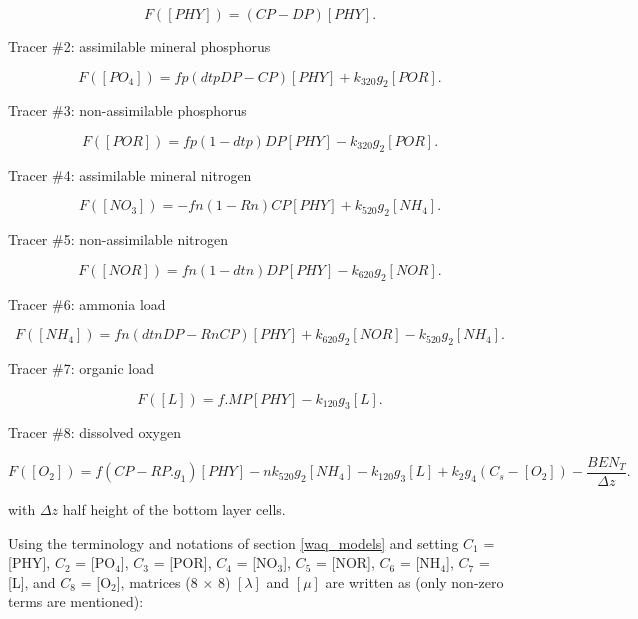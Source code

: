 \begin{equation}
  F([PHY]) = (CP-DP) [PHY].
\end{equation}

Tracer $\#$2: assimilable mineral phosphorus

\begin{equation}
  F([PO_4]) = fp(dtp DP - CP) [PHY] + k_{320} g_2 [POR].
\end{equation}

Tracer $\#$3: non-assimilable phosphorus

\begin{equation}
  F([POR]) = fp(1-dtp) DP [PHY] - k_{320} g_2 [POR].
\end{equation}

Tracer $\#$4: assimilable mineral nitrogen

\begin{equation}
  F([NO_3]) = - fn (1- Rn) CP [PHY] + k_{520} g_2 [NH_4].
\end{equation}

Tracer $\#$5: non-assimilable nitrogen

\begin{equation}
  F([NOR]) = fn (1- dtn) DP [PHY] - k_{620} g_2 [NOR].
\end{equation}

Tracer $\#$6: ammonia load

\begin{equation}
  F([NH_4]) = fn (dtn DP - Rn CP) [PHY] + k_{620} g_2 [NOR] - k_{520} g_2 [NH_4].
\end{equation}

Tracer $\#$7: organic load

\begin{equation}
  F([L]) = f.MP [PHY] - k_{120} g_3 [L].
\end{equation}

Tracer $\#$8: dissolved oxygen

\begin{equation}
  F([O_2]) = f (CP - RP.g_1) [PHY] - n k_{520} g_2 [NH_4] - k_{120} g_3 [L] + k_2 g_4 (C_s - [O_2]) - \frac{BEN_T}{\Delta z}.
\end{equation}

with $\Delta z$ half height of the bottom layer cells.

Using the terminology and notations of section \ref{waq_models} and setting
$C_1$ = [PHY], $C_2$  = [PO$_4$], $C_3$ = [POR], $C_4$ = [NO$_3$], $C_5$ = [NOR],
$C_6$ = [NH$_4$], $C_7$ = [L], and $C_8$ = [O$_2$],
matrices (8 $\times$ 8) $[\lambda]$ and $[\mu]$
are written as (only non-zero terms are mentioned):\\

